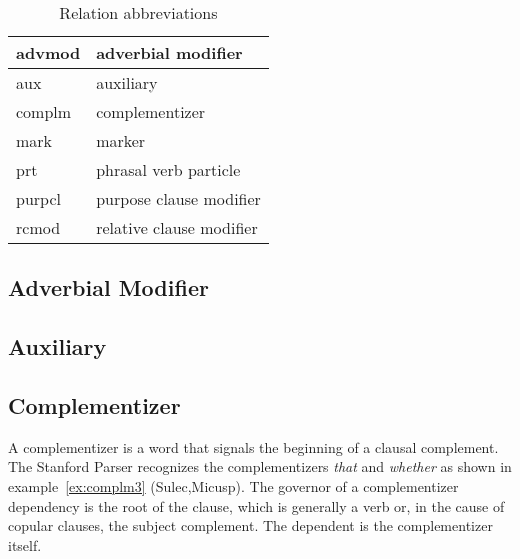 \documentclass[main.tex]{subfiles}
\begin{document}
\begin{table}
\caption{Relation abbreviations}
\begin{center}
  \begin{tabular}{| l | l |}
    \hline
    advmod & adverbial modifier  \\
    \hline
    aux & auxiliary \\
    \hline
    complm & complementizer \\
    \hline
    mark & marker \\
    \hline
    prt & phrasal verb particle \\
    \hline
    purpcl & purpose clause modifier \\
    \hline
    rcmod & relative clause modifier \\
    \hline
  \end{tabular}
\end{center}
\label{table:reln-abbr}
\end{table}

\subsection{Adverbial Modifier}
\subsection{Auxiliary}
\subsection{Complementizer}

A complementizer is a word that signals the beginning of a clausal complement. The Stanford Parser recognizes the complementizers \textit{that} and \textit{whether} as shown in example~\ref{ex:complm3} (Sulec,Micusp). The governor of a complementizer dependency is the root of the clause, which is generally a verb or, in the cause of copular clauses, the subject complement. The dependent is the complementizer itself.


\end{document}
